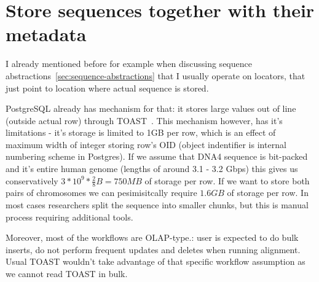
\section{Store sequences together with their metadata}
\label{sec:pg-storage-role}

I already mentioned before for example when discussing sequence abstractions~\ref{sec:sequence-abstractions} that I usually operate on locators, that just point to location where actual sequence is stored.

PostgreSQL already has mechanism for that: it stores large values out of line (outside actual row) through TOAST~\autocite{postgresql17_toast}. 
This mechanism however, has it's limitations - it's storage is limited to 1GB per row, which is an effect of maximum width of integer storing row's OID (object indentifier is internal numbering scheme in Postgres).
If we assume that DNA4 sequence is bit-packed and it's entire human genome (lengths of around 3.1 - 3.2 Gbps) this gives us conservatively $3 * 10^{9} * \frac{2}{8}B = 750MB$ of storage per row.
If we want to store both pairs of chromosomes we can pesimisitcally require $1.6GB$ of storage per row. 
In most cases researchers split the sequence into smaller chunks, but this is manual process requiring additional tools.

Moreover, most of the workflows are OLAP-type.: user is expected to do bulk inserts, do not perform frequent updates and deletes when running alignment.
Usual TOAST wouldn't take advantage of that specific workflow assumption as we cannot read TOAST in bulk.

